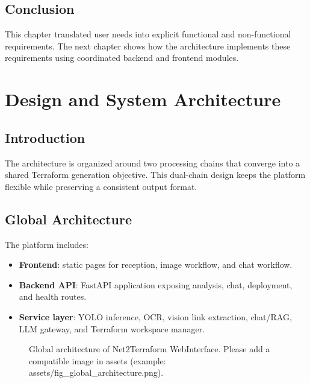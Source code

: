 \documentclass[12pt,a4paper,openany]{report}
\begin{document}
\section{Conclusion}

This chapter translated user needs into explicit functional and non-functional requirements. The next chapter shows how the architecture implements these requirements using coordinated backend and frontend modules.

\chapter{Design and System Architecture}

\section{Introduction}

The architecture is organized around two processing chains that converge into a shared Terraform generation objective. This dual-chain design keeps the platform flexible while preserving a consistent output format.

\section{Global Architecture}

The platform includes:
\begin{itemize}
    \item \textbf{Frontend}: static pages for reception, image workflow, and chat workflow.
    \item \textbf{Backend API}: FastAPI application exposing analysis, chat, deployment, and health routes.
    \item \textbf{Service layer}: YOLO inference, OCR, vision link extraction, chat/RAG, LLM gateway, and Terraform workspace manager.
\end{itemize}

\begin{figure}[H]
    \centering
    \caption{Global architecture of Net2Terraform WebInterface. Please add a compatible image in assets (example: assets/fig_global_architecture.png).}
    \label{fig:global_architecture}
\end{figure}
\end{document}
